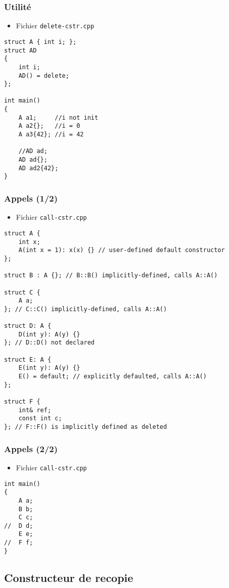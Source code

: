 \begin{frame}[containsverbatim]
\frametitle{Utilité}
\begin{itemize}
\item Fichier \texttt{delete-cstr.cpp}
\end{itemize}
\begin{lstlisting}
struct A { int i; };
struct AD
{
    int i;
    AD() = delete;
};

int main()
{
    A a1;     //i not init
    A a2{};   //i = 0
    A a3{42}; //i = 42
    
    //AD ad;
    AD ad{};
    AD ad2{42};
}

\end{lstlisting}
\end{frame}

\begin{frame}[containsverbatim]
\frametitle{Appels (1/2)}
\begin{itemize}
\item Fichier \texttt{call-cstr.cpp}
\end{itemize}
\begin{lstlisting}
struct A {
    int x;
    A(int x = 1): x(x) {} // user-defined default constructor
};
 
struct B : A {}; // B::B() implicitly-defined, calls A::A()
 
struct C {
    A a;    
}; // C::C() implicitly-defined, calls A::A()
 
struct D: A {
    D(int y): A(y) {}
}; // D::D() not declared
 
struct E: A {
    E(int y): A(y) {}
    E() = default; // explicitly defaulted, calls A::A()
};
 
struct F {
    int& ref; 
    const int c;    
}; // F::F() is implicitly defined as deleted
\end{lstlisting}
\end{frame}

\begin{frame}[containsverbatim]
\frametitle{Appels (2/2)}
\begin{itemize}
\item Fichier \texttt{call-cstr.cpp}
\end{itemize}
\begin{lstlisting}
int main()
{
    A a;
    B b;
    C c;
//  D d; 
    E e;
//  F f; 
}
\end{lstlisting}
\end{frame}

\subsection{Constructeur de recopie}

